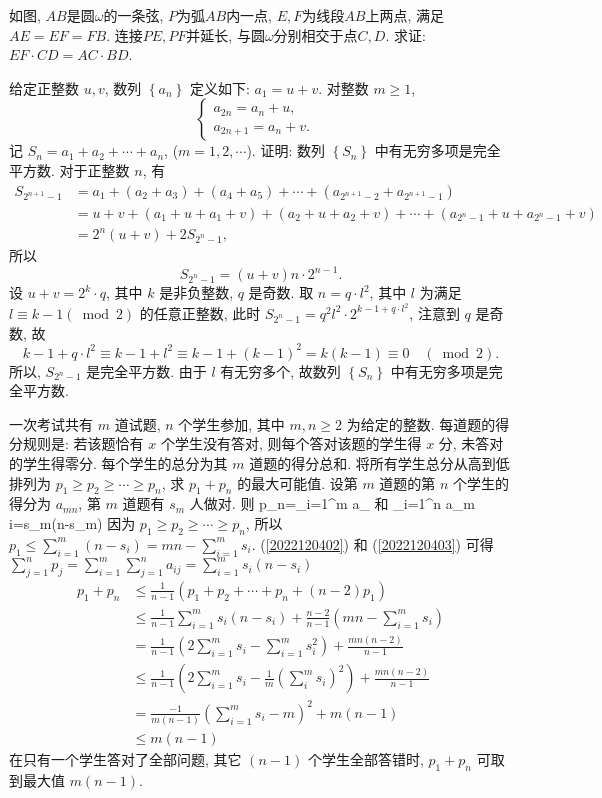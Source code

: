 \bq{}{}
如图, $AB$是圆$\omega$的一条弦, $P$为弧$AB$内一点, $E,F$为线段$AB$上两点, 满足$AE=EF=FB$. 连接$PE,PF$并延长, 与圆$\omega$分别相交于点$C,D$.
求证: $EF\cdot CD=AC\cdot BD$.
\eq

\bq{}{}
给定正整数 $u, v$, 数列 $\left\{a_n\right\}$ 定义如下: $a_1=u+v$. 对整数 $m \geq 1$,
$$
\begin{cases}
	a_{2 n}=a_n+u, &\\
	a_{2 n+1}=a_n+v. &
\end{cases}
$$
记 $S_n=a_1+a_2+\cdots+a_n$, ($m=1,2, \cdots$). 
证明: 数列 $\left\{S_n\right\}$ 中有无穷多项是完全平方数.
\eq
\ba
对于正整数 $n$, 有
\begin{align*}
	S_{2^{n+1}-1} & =a_1+\left(a_2+a_3\right)+\left(a_4+a_5\right)+\cdots+\left(a_{2^{n+1}-2}+a_{2^{n+1}-1}\right) \\
	& =u+v+\left(a_1+u+a_1+v\right)+\left(a_2+u+a_2+v\right)+\cdots+\left(a_{2^n-1}+u+a_{2^n-1}+v\right) \\
	& =2^n(u+v)+2 S_{2^n-1},
\end{align*}
所以
$$
S_{2^n-1}=(u+v) n \cdot 2^{n-1} .
$$
设 $u+v=2^k \cdot q$, 其中 $k$ 是非负整数, $q$ 是奇数. 取 $n=q \cdot l^2$, 其中 $l$ 为满足 $l \equiv k-1(\bmod 2)$ 的任意正整数, 
此时 $S_{2^n-1}=q^2 l^2 \cdot 2^{k-1+q \cdot l^2}$, 注意到 $q$ 是奇数, 故
$$
k-1+q \cdot l^2 \equiv k-1+l^2 \equiv k-1+(k-1)^2=k(k-1) \equiv 0 \quad(\bmod 2) .
$$
所以, $S_{2^n-1}$ 是完全平方数. 由于 $l$ 有无穷多个, 故数列 $\left\{S_n\right\}$ 中有无穷多项是完全平方数.
\ea

\bq{}{}
一次考试共有 $m$ 道试题, $n$ 个学生参加, 其中 $m, n \geq 2$ 为给定的整数. 每道题的得分规则是: 若该题恰有 $x$ 个学生没有答对, 
则每个答对该题的学生得 $x$ 分, 未答对的学生得零分. 每个学生的总分为其 $m$ 道题的得分总和. 将所有学生总分从高到低排列为 $p_1 \geq p_2 \geq \cdots \geq p_n$, 
求 $p_1+p_n$ 的最大可能值.
\eq
\ba
设第 $m$ 道题的第 $n$ 个学生的得分为 $a_{m n}$, 第 $m$ 道题有 $s_m$ 人做对. 则
\be\label{2022120402}
p_n=\sum_{i=1}^m a_{}
\ee
和
\be\label{2022120403}
\sum_{i=1}^n a_{m i}=s_m\left(n-s_m\right)
\ee
因为 $p_1 \geq p_2 \geq \cdots \geq p_n$, 所以 $p_1 \leq \sum_{i=1}^m\left(n-s_i\right)=m n-\sum_{i=1}^m s_i$. 
(\ref{2022120402}) 和 (\ref{2022120403}) 可得 $\sum_{j=1}^n p_j=\sum_{i=1}^m \sum_{j=1}^n a_{i j}=\sum_{i=1}^m s_i\left(n-s_i\right)$
\begin{align*}
	p_1+p_n & \leq \frac{1}{n-1}\left(p_1+p_2+\cdots+p_n+(n-2) p_1\right) \\
	& \leq \frac{1}{n-1} \sum_{i=1}^m s_i\left(n-s_i\right)+\frac{n-2}{n-1}\left(m n-\sum_{i=1}^m s_i\right) \\
	& =\frac{1}{n-1}\left(2 \sum_{i=1}^m s_i-\sum_{i=1}^m s_i^2\right)+\frac{m n(n-2)}{n-1} \\
	& \leq \frac{1}{n-1}\left(2 \sum_{i=1}^m s_i-\frac{1}{m}\left(\sum_i^m s_i\right)^2\right)+\frac{m n(n-2)}{n-1} \\
	& =\frac{-1}{m(n-1)}\left(\sum_{i=1}^m s_i-m\right)^{2}+m(n-1) \\
	& \leq m(n-1)
\end{align*}
在只有一个学生答对了全部问题, 其它 $(n-1)$ 个学生全部答错时, $p_1+p_n$ 可取到最大值 $m(n-1)$.
\ea

